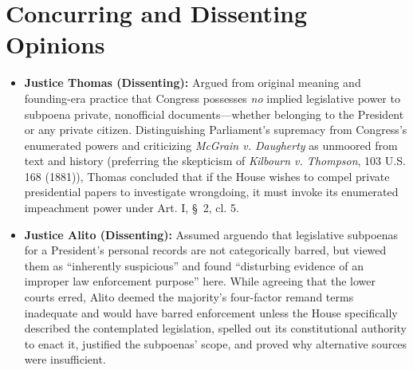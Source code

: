 \documentclass[12pt]{article}
\begin{document}
\section{Concurring and Dissenting Opinions}
\begin{itemize}
  \item \textbf{Justice Thomas (Dissenting):} Argued from original meaning and founding-era practice that Congress possesses \textit{no} implied legislative power to subpoena private, nonofficial documents---whether belonging to the President or any private citizen. Distinguishing Parliament's supremacy from Congress's enumerated powers and criticizing \textit{McGrain v. Daugherty} as unmoored from text and history (preferring the skepticism of \textit{Kilbourn v. Thompson}, 103 U.S. 168 (1881)), Thomas concluded that if the House wishes to compel private presidential papers to investigate wrongdoing, it must invoke its enumerated impeachment power under Art. I, \S~2, cl. 5.
  \item \textbf{Justice Alito (Dissenting):} Assumed arguendo that legislative subpoenas for a President's personal records are not categorically barred, but viewed them as ``inherently suspicious'' and found ``disturbing evidence of an improper law enforcement purpose'' here. While agreeing that the lower courts erred, Alito deemed the majority's four-factor remand terms inadequate and would have barred enforcement unless the House specifically described the contemplated legislation, spelled out its constitutional authority to enact it, justified the subpoenas' scope, and proved why alternative sources were insufficient.
\end{itemize}
\end{document}
